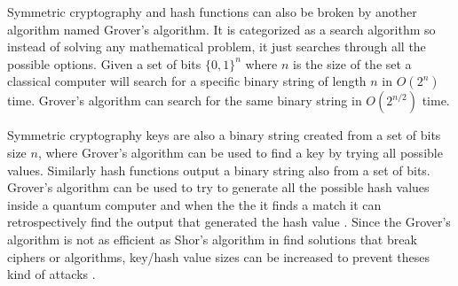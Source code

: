 Symmetric cryptography and hash functions can also be broken by another algorithm named Grover's algorithm. It is categorized as a search algorithm so instead of solving any mathematical problem, it just searches through all the possible options. Given a set of bits $\{0, 1\}^n$ where $n$ is the size of the set a classical computer will search for a specific binary string of length $n$ in $O(2^n)$ time. Grover's algorithm can search for the same binary string in $O(2^{n/2})$ time. \cite{Yanofsky2008}

Symmetric cryptography keys are also a binary string created from a set of bits size $n$, where Grover's algorithm can be used to find a key by trying all possible values. Similarly hash functions output a binary string also from a set of bits. Grover's algorithm can be used to try to generate all the possible hash values inside a quantum computer and when the the it finds a match it can retrospectively find the output that generated the hash value \cite{Pretson2022}. Since the Grover's algorithm is not as efficient as Shor's algorithm in find solutions that break ciphers or algorithms, key/hash value sizes can be increased to prevent theses kind of attacks \cite{Chen2016}.
